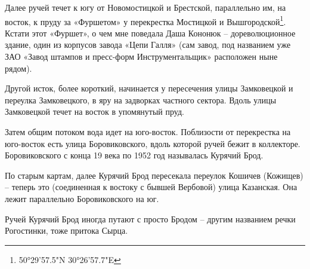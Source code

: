 Далее ручей течет к югу от Новомостицкой и Брестской, параллельно им, на восток, к пруду за «Фуршетом» у перекрестка Мостицкой и Вышгородской\footnote{50°29'57.5"N 30°26'57.7"E}. Кстати этот «Фуршет», о чем мне поведала Даша Кононюк – дореволюционное здание, один из корпусов завода «Цепи Галля» (сам завод, под названием уже ЗАО «Завод штампов и пресс-форм Инструментальщик»  расположен ныне рядом).


Другой исток, более короткий, начинается у пересечения улицы Замковецкой и переулка Замковецкого, в яру на задворках частного сектора. Вдоль улицы Замковецкой течет на восток в упомянутый пруд. 

Затем общим потоком вода идет на юго-вос\-ток. Поблизости от перекрестка на юго-восток есть улица Боровиковского, вдоль которой ручей бежит в коллекторе. Боровиковского с конца 19 века по 1952 год называлась Курячий Брод.

По старым картам, далее Курячий Брод пересекала переулок Кошичев (Кожищев) – теперь это (соединенная к востоку с бывшей Вербовой) улица Казанская. Она лежит параллельно Боровиковского на юг.

Ручей Курячий Брод иногда путают с просто Бродом – другим названием речки Рогостинки, тоже притока Сырца. 
